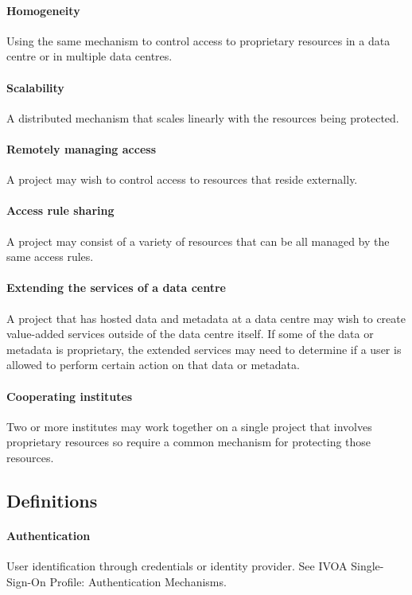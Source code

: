 \documentclass[11pt,a4paper]{ivoa}
\begin{document}
\paragraph{Homogeneity} Using the same mechanism to control access to proprietary resources in a data centre or in multiple data centres.

\paragraph{Scalability} A distributed mechanism that scales linearly with the resources being protected.

\paragraph{Remotely managing access} A project may wish to control access to resources that reside externally.

\paragraph{Access rule sharing} A project may consist of a variety of resources that can be all managed by the same access rules.

\paragraph{Extending the services of a data centre} A project that has hosted data and metadata at a data centre may wish to create value-added services outside of the data centre itself.  If some of the data or metadata is proprietary, the extended services may need to determine if a user is allowed to perform certain action on that data or metadata.

\paragraph{Cooperating institutes} Two or more institutes may work together on a single project that involves proprietary resources so require a common mechanism for protecting those resources.

\subsection{Definitions}

\paragraph{Authentication} User identification through credentials or identity provider.  See IVOA Single-Sign-On Profile: Authentication Mechanisms.  \citep{std:SSOAUTH}
\end{document}
